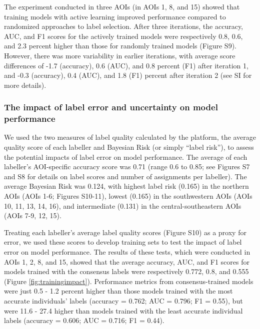 \documentclass[11pt,a4paper]{article}
\begin{document}
The experiment conducted in three AOIs (in AOIs 1, 8, and 15) showed
that training models with active learning improved performance compared
to randomized approaches to label selection. After three iterations, the
accuracy, AUC, and F1 scores for the actively trained models were
respectively 0.8, 0.6, and 2.3 percent higher than those for randomly
trained models (Figure S9). However, there was more variability in
earlier iterations, with average score differences of -1.7 (accuracy),
0.6 (AUC), and 0.8 percent (F1) after iteration 1, and -0.3 (accuracy),
0.4 (AUC), and 1.8 (F1) percent after iteration 2 (see SI for more
details).

\hypertarget{the-impact-of-label-error-and-uncertainty-on-model-performance}{%
\subsubsection{The impact of label error and uncertainty on model
performance}\label{the-impact-of-label-error-and-uncertainty-on-model-performance}}

We used the two measures of label quality calculated by the platform,
the average quality score of each labeller and Bayesian Risk (or simply
``label risk''), to assess the potential impacts of label error on model
performance. The average of each labeller's AOI-specific accuracy score
was 0.71 (range 0.6 to 0.85; see Figures S7 and S8 for details on label
scores and number of assignments per labeller). The average Bayesian
Risk was 0.124, with highest label risk (0.165) in the northern AOIs
(AOIs 1-6; Figures S10-11), lowest (0.165) in the southwestern AOIs
(AOIs 10, 11, 13, 14, 16), and intermediate (0.131) in the
central-southeastern AOIs (AOIs 7-9, 12, 15).

Treating each labeller's average label quality scores (Figure S10) as a
proxy for error, we used these scores to develop training sets to test
the impact of label error on model performance. The results of these
tests, which were conducted in AOIs 1, 2, 8, and 15, showed that the
average accuracy, AUC, and F1 scores for models trained with the
consensus labels were respectively 0.772, 0.8, and 0.555 (Figure
\ref{fig:trainingimpact}). Performance metrics from consensus-trained
models were just 0.5 - 1.2 percent higher than those models trained with
the most accurate individuals' labels (accuracy = 0.762; AUC = 0.796; F1
= 0.55), but were 11.6 - 27.4 higher than models trained with the least
accurate individual labels (accuracy = 0.606; AUC = 0.716; F1 = 0.44).
\end{document}
